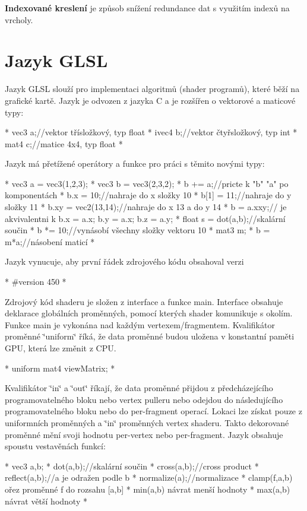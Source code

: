 {\bfseries Indexované kreslení} je způsob snížení redundance dat s využitím indexů na vrcholy.  \hypertarget{index_glsl}{}\section{Jazyk G\+L\+S\+L}\label{index_glsl}
Jazyk G\+L\+S\+L slouží pro implementaci algoritmů (shader programů), které běží na grafické kartě. Jazyk je odvozen z jazyka C a je rozšířen o vektorové a maticové typy\+: \begin{DoxyVerb}* vec3 a;//vektor třísložkový, typ float
* ivec4 b;//vektor čtyřsložkový, typ int
* mat4 c;//matice 4x4, typ float
* \end{DoxyVerb}
 Jazyk má přetížené operátory a funkce pro práci s těmito novými typy\+: \begin{DoxyVerb}* vec3 a = vec3(1,2,3);
* vec3 b = vec3(2,3,2);
* b += a;//pricte k "b" "a" po komponentách
* b.x = 10;//nahraje do x složky 10
* b[1] = 11;//nahraje do y složky 11
* b.xy = vec2(13,14);//nahraje do x 13 a do y 14
* b = a.xxy;// je akvivalentni k b.x = a.x; b.y = a.x; b.z = a.y;
* float s = dot(a,b);//skalární součin
* b *= 10;//vynásobí všechny složky vektoru 10
* mat3 m;
* b = m*a;//násobení maticí
* \end{DoxyVerb}
 Jazyk vynucuje, aby první řádek zdrojového kódu obsahoval verzi \begin{DoxyVerb}* #version 450
* \end{DoxyVerb}
 Zdrojový kód shaderu je složen z interface a funkce main. Interface obsahuje deklarace globálních proměnných, pomocí kterých shader komunikuje s okolím. Funkce main je vykonána nad každým vertexem/fragmentem. Kvalifikátor proměnné \char`\"{}uniform\char`\"{} říká, že data proměnné budou uložena v konstantní paměti G\+P\+U, která lze změnit z C\+P\+U. \begin{DoxyVerb}* uniform mat4 viewMatrix;
* \end{DoxyVerb}
 Kvalifikátor \char`\"{}in\char`\"{} a \char`\"{}out\char`\"{} říkají, že data proměnné přijdou z předcházejícího programovatelného bloku nebo vertex pulleru nebo odejdou do následujícího programovatelného bloku nebo do per-\/fragment operací. Lokaci lze získat pouze z uniformních proměnných a \char`\"{}in\char`\"{} proměnných vertex shaderu. Takto dekorované proměnné mění svoji hodnotu per-\/vertex nebo per-\/fragment. Jazyk obsahuje spoustu vestavěnách funkcí\+: \begin{DoxyVerb}* vec3 a,b;
* dot(a,b);//skalární součin
* cross(a,b);//cross product
* reflect(a,b);//a je odražen podle b
* normalize(a);//normalizace
* clamp(f,a,b) ořez proměnné f do rozsahu [a,b]
* min(a,b) návrat menší hodnoty
* max(a,b) návrat větší hodnoty
* \end{DoxyVerb}
